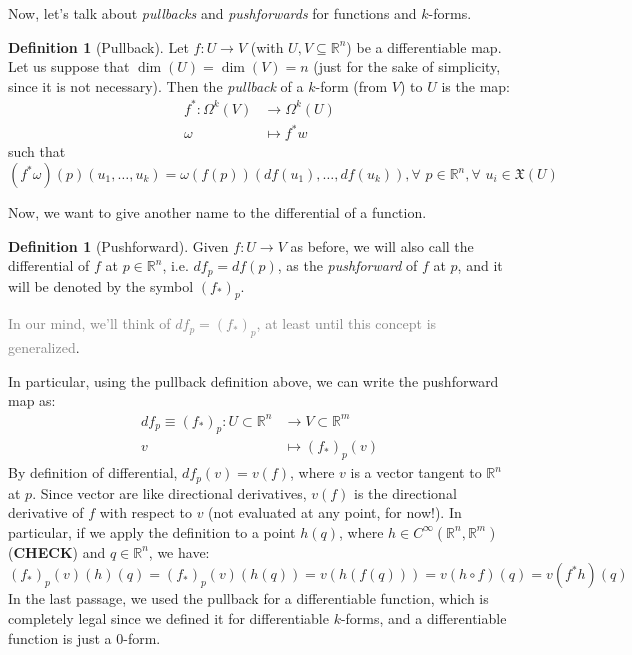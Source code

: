\documentclass[a4paper,11pt,titlepage]{article}
\numberwithin{equation}{section}
\theoremstyle{definition}
\newtheorem{definition}[theorem]{Definition}
\theoremstyle{remark}
\newcommand{\rfield}{\mathbb{R}}
\begin{document}
Now, let's talk about \textit{pullbacks} and \textit{pushforwards} for functions and $k$-forms.

\begin{definition}[Pullback]
  Let $f \colon U \rightarrow V$ (with $U, V \subseteq \rfield^n$) be a differentiable map. Let us suppose that $\dim(U) = \dim(V) = n$ (just for the sake of simplicity, since it is not necessary). Then the \textit{pullback} of a $k$-form (from $V$) to $U$ is the map:
  \begin{align*} \label{pullbackdef}
    f^* \colon \Omega^k(V) & \rightarrow \Omega^k(U) \\
    \omega & \mapsto f^*w
  \end{align*}
  such that
  \begin{equation*}
    (f^* \omega)(p) (u_1, \ldots, u_k) = \omega (f(p)) (df(u_1), \ldots, df(u_k)), \forall\, \, p \in \rfield^n, \forall \,\, u_i \in \mathfrak{X}(U)
  \end{equation*}
\end{definition}

Now, we want to give another name to the differential of a function.
\begin{definition}[Pushforward]
  Given $f \colon U \rightarrow V$ as before, we will also call the differential of $f$ at $p \in \rfield^n$, i.e. $df_p = df(p)$, as the \textit{pushforward} of $f$ at $p$, and it will be denoted by the symbol $(f_*)_p$.

  \textcolor{gray}{In our mind, we'll think of $df_p = (f_*)_p$, at least until this concept is generalized}.
\end{definition}

In particular, using the pullback definition above, we can write the pushforward map as:
\begin{align*}
  df_p \equiv (f_*)_p \colon U \subset \rfield^n &\rightarrow V \subset \rfield^m \\
    v & \mapsto (f_*)_p (v)
\end{align*}
By definition of differential, $df_p(v) = v(f)$, where $v$ is a vector tangent to $\rfield^n$ at $p$. Since vector are like directional derivatives, $v(f)$ is the directional derivative of $f$ with respect to $v$ (not evaluated at any point, for now!). In particular, if we apply the definition to a point $h(q)$, where $h \in C^{\infty}(\rfield^n, \rfield^m)$ (\textbf{CHECK}) and $q \in \rfield^n$, we have:
$$(f_*)_p (v)(h)(q) = (f_*)_p (v)(h(q)) = v(h(f(q))) = v(h \circ f) (q) = v (f^* h) (q)$$
In the last passage, we used the pullback for a differentiable function, which is completely legal since we defined it for differentiable $k$-forms, and a differentiable function is just a 0-form.
\end{document}
